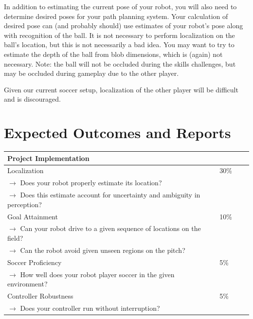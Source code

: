 In addition to estimating the current pose of your robot, you will also need to determine desired poses for your path planning system.  Your calculation of desired pose can (and probably should) use estimates of your robot's pose along with recognition of the ball.  It is not necessary to perform localization on the ball's location, but this is not necessarily a bad idea.  You may want to try to estimate the depth of the ball from blob dimensions, which is (again) not necessary.  Note: the ball will not be occluded during the skills challenges, but may be occluded during gameplay due to the other player.

Given our current soccer setup, localization of the other player will be difficult and is discouraged. 


\section{Expected Outcomes and Reports}

\vspace{1cm}
\begin{tabular}{|l|l||l|l|}
\hline
{\large \bf Project Implementation} & \\
\hline
\hline
Localization & 30\% \\
$\rightarrow$ Does your robot properly estimate its location? & \\
$\rightarrow$ Does this estimate account for uncertainty and ambiguity in perception? & \\
\hline
Goal Attainment  & 10\% \\
$\rightarrow$ Can your robot drive to a given sequence of locations on the field? & \\
$\rightarrow$ Can the robot avoid given unseen regions on the pitch? & \\
\hline
Soccer Proficiency & 5\% \\
$\rightarrow$ How well does your robot player soccer in the given environment? & \\
\hline
Controller Robustness & 5\% \\
$\rightarrow$ Does your controller run without interruption? & \\
\hline
\end{tabular}

\newpage
